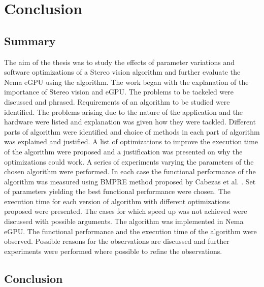 \chapter{Conclusion}
\label{chap:conclusion}


\section{Summary}

The aim of the thesis was to study the effects of parameter variations and software optimizations of a Stereo vision algorithm and further evaluate the Nema eGPU using the algorithm. The work began with the explanation of the importance of Stereo vision and eGPU. The problems to be tackeled were discussed and phrased. Requirements of an algorithm to be studied were identified. The problems arising due to the nature of the application and the hardware were listed and explanation was given how they were tackled. Different parts of algorithm were identified and choice of methods in each part of algorithm was explained and justified. A list of optimizations to improve the execution time of the algorithm were proposed and a justification was presented on why the optimizations could work. A series of experiments varying the parameters of the chosen algorithm were performed. In each case the functional performance of the algorithm was measured using BMPRE method proposed by Cabezas et al. \cite{Cabezas2012}. Set of parameters yielding the best functional performance were chosen. The execution time for each version of algorithm with different optimizations proposed were presented. The cases for which speed up was not achieved were discussed with possible arguments. The algorithm was implemented in Nema eGPU. The functional performance and the execution time of the algorithm were observed. Possible reasons for the observations are discussed and further experiments were performed where possible to refine the observations.


%


\section{Conclusion}

